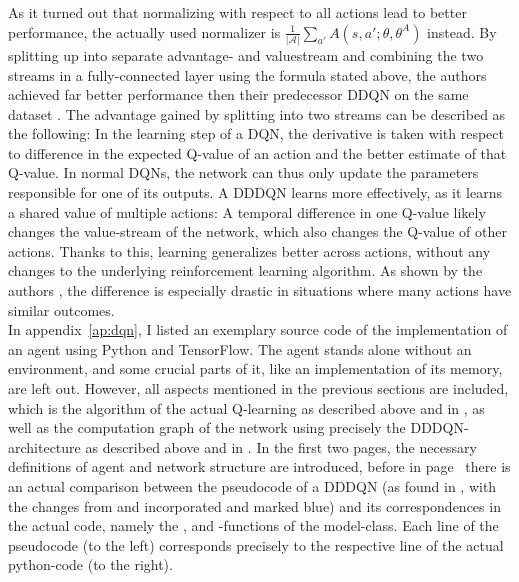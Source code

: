 As it turned out that normalizing with respect to all actions lead to better performance, the actually used normalizer is $\frac{1}{|\mathcal{A}|} \sum_{a'} A(s, a'; \theta, \theta^A)$ instead. By splitting up into separate advantage- and valuestream and combining the two streams in a fully-connected layer using the formula stated above, the authors achieved far better performance then their predecessor DDQN on the same dataset \cite{wang_dueling_2015}. The advantage gained by splitting into two streams can be described as the following: In the learning step of a DQN, the derivative is taken with respect to difference in the expected Q-value of an action and the better estimate of that Q-value. In normal DQNs, the network can thus only update the parameters responsible for one of its outputs. A DDDQN learns more effectively, as it learns a shared value of multiple actions: A temporal difference in one Q-value likely changes the value-stream of the network, which also changes the Q-value of other actions. Thanks to this, learning generalizes better across actions, without any changes to the underlying reinforcement learning algorithm. As shown by the authors \cite{wang_dueling_2015}, the difference is especially drastic in situations where many actions have similar outcomes.\\


In appendix~\ref{ap:dqn}, I listed an exemplary source code of the implementation of an agent using Python and TensorFlow. The agent stands alone without an environment, and some crucial parts of it, like an implementation of its memory, are left out. However, all aspects mentioned in the previous sections are included, which is the algorithm of the actual Q-learning as described above and in \cite{van_hasselt_deep_2015}, as well as the computation graph of the network using precisely the DDDQN-architecture as described above and in \cite{wang_dueling_2015}. In the first two pages, the necessary definitions of agent and network structure are introduced, before in page~\pageref{ap:dqn_comparison} there is an actual comparison between the pseudocode of a DDDQN (as found in \cite{mnih_human-level_2015}, with the changes from \cite{van_hasselt_deep_2015} and \cite{lillicrap_continuous_2015} incorporated and marked blue) and its correspondences in the actual code, namely the ,  and -functions of the model-class. Each line of the pseudocode (to the left) corresponds precisely to the respective line of the actual python-code (to the right).


